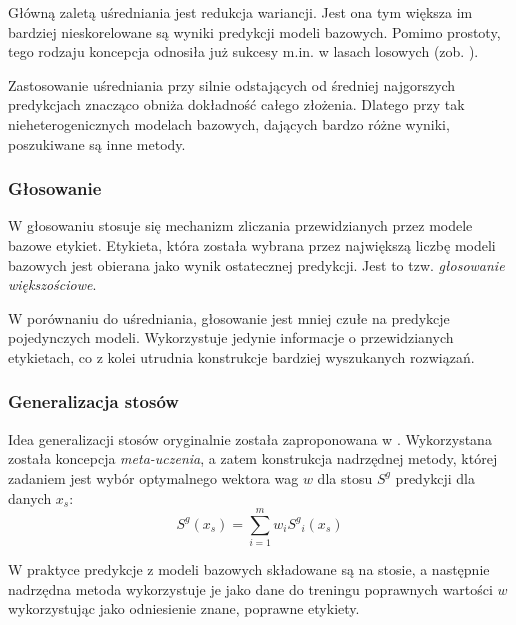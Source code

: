 Główną zaletą uśredniania jest redukcja wariancji. Jest ona tym większa \linebreak im bardziej nieskorelowane są wyniki predykcji modeli bazowych. Pomimo prostoty, tego rodzaju koncepcja odnosiła już sukcesy m.in. w lasach losowych (zob. \cite{Breiman2001}).

Zastosowanie uśredniania przy silnie odstających od średniej najgorszych predykcjach znacząco obniża dokładność całego złożenia. Dlatego przy tak nieheterogenicznych modelach bazowych, dających bardzo różne wyniki, poszukiwane są inne metody.

\subsubsection{Głosowanie}

W głosowaniu stosuje się mechanizm zliczania przewidzianych przez modele bazowe etykiet. Etykieta, która została wybrana przez największą liczbę modeli bazowych jest obierana jako wynik ostatecznej predykcji. Jest to tzw. \textit{głosowanie większościowe}.

W porównaniu do uśredniania, głosowanie jest mniej czułe na predykcje pojedynczych modeli. Wykorzystuje jedynie informacje o przewidzianych etykietach, \linebreak co z kolei utrudnia konstrukcje bardziej wyszukanych rozwiązań.

\subsubsection{Generalizacja stosów}
Idea generalizacji stosów oryginalnie została zaproponowana w \cite{Wolpert92stackedgeneralization}. Wykorzystana została koncepcja \textit{meta-uczenia}, a zatem konstrukcja nadrzędnej metody, której zadaniem jest wybór optymalnego wektora wag $w$ dla stosu $S^g$ predykcji dla danych $x_s$:
\begin{equation}
S^g(x_s) = \sum_{i=1}^{m}w_i {S^g}_i(x_s)
\end{equation}

W praktyce predykcje z modeli bazowych składowane są na stosie, a następnie nadrzędna metoda wykorzystuje je jako dane do treningu poprawnych wartości $w$ wykorzystując jako odniesienie znane, poprawne etykiety.

    

